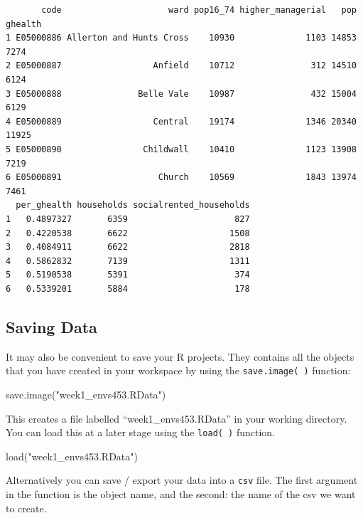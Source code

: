 \documentclass[
  letterpaper,
  DIV=11,
  numbers=noendperiod,
  oneside]{scrreprt}
\newenvironment{Shaded}{\begin{snugshade}}{\end{snugshade}}
\newcommand{\FunctionTok}[1]{\textcolor[rgb]{0.28,0.35,0.67}{#1}}
\newcommand{\NormalTok}[1]{\textcolor[rgb]{0.00,0.23,0.31}{#1}}
\newcommand{\StringTok}[1]{\textcolor[rgb]{0.13,0.47,0.30}{#1}}
\begin{document}
\begin{verbatim}
       code                     ward pop16_74 higher_managerial   pop ghealth
1 E05000886 Allerton and Hunts Cross    10930              1103 14853    7274
2 E05000887                  Anfield    10712               312 14510    6124
3 E05000888               Belle Vale    10987               432 15004    6129
4 E05000889                  Central    19174              1346 20340   11925
5 E05000890                Childwall    10410              1123 13908    7219
6 E05000891                   Church    10569              1843 13974    7461
  per_ghealth households socialrented_households
1   0.4897327       6359                     827
2   0.4220538       6622                    1508
3   0.4084911       6622                    2818
4   0.5862832       7139                    1311
5   0.5190538       5391                     374
6   0.5339201       5884                     178
\end{verbatim}

\subsection{Saving Data}\label{saving-data}

It may also be convenient to save your R projects. They contains all the
objects that you have created in your workspace by using the
\texttt{save.image(\ )} function:

\begin{Shaded}
\begin{Highlighting}[]
\FunctionTok{save.image}\NormalTok{(}\StringTok{"week1\_envs453.RData"}\NormalTok{)}
\end{Highlighting}
\end{Shaded}

This creates a file labelled ``week1\_envs453.RData'' in your working
directory. You can load this at a later stage using the
\texttt{load(\ )} function.

\begin{Shaded}
\begin{Highlighting}[]
\FunctionTok{load}\NormalTok{(}\StringTok{"week1\_envs453.RData"}\NormalTok{)}
\end{Highlighting}
\end{Shaded}

Alternatively you can save / export your data into a \texttt{csv} file.
The first argument in the function is the object name, and the second:
the name of the csv we want to create.
\end{document}
